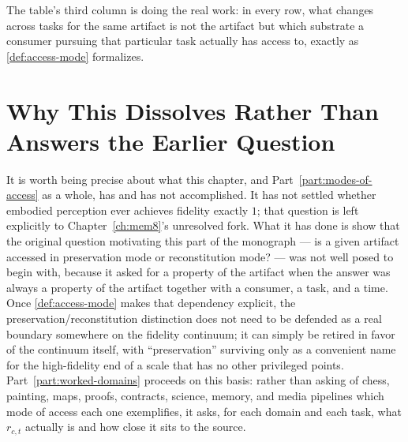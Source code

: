 The table's third column is doing the real work: in every row, what
changes across tasks for the same artifact is not the artifact but which
substrate a consumer pursuing that particular task actually has access
to, exactly as \cref{def:access-mode} formalizes.

\section{Why This Dissolves Rather Than Answers the Earlier Question}

It is worth being precise about what this chapter, and
Part~\ref{part:modes-of-access} as a whole, has and has not accomplished.
It has not settled whether embodied perception ever achieves fidelity
exactly $1$; that question is left explicitly to
Chapter~\ref{ch:mem8}'s unresolved fork. What it has done is show that
the original question motivating this part of the monograph --- is a
given artifact accessed in preservation mode or reconstitution mode? ---
was not well posed to begin with, because it asked for a property of the
artifact when the answer was always a property of the artifact together
with a consumer, a task, and a time. Once \cref{def:access-mode} makes
that dependency explicit, the preservation/reconstitution distinction
does not need to be defended as a real boundary somewhere on the fidelity
continuum; it can simply be retired in favor of the continuum itself,
with ``preservation'' surviving only as a convenient name for the
high-fidelity end of a scale that has no other privileged points.
Part~\ref{part:worked-domains} proceeds on this basis: rather than asking
of chess, painting, maps, proofs, contracts, science, memory, and media
pipelines which mode of access each one exemplifies, it asks, for each
domain and each task, what $r_{c,t}$ actually is and how close it sits to
the source.
